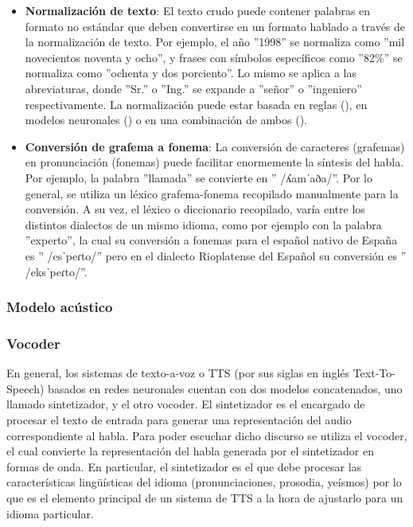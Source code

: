 \begin{itemize}
    \item \textbf{Normalización de texto}: El texto crudo puede contener palabras en formato no estándar que deben convertirse en un formato hablado a través de la normalización de texto. Por ejemplo, el año ''1998'' se normaliza como ''mil novecientos noventa y ocho'', y frases con símbolos específicos como ''82\%'' se normaliza como ''ochenta y dos porciento''. Lo mismo se aplica a las abreviaturas, donde ''Sr.'' o ''Ing.'' se expande a ''señor'' o ''ingeniero'' respectivamente. La normalización puede estar basada en reglas (\cite{sproat2001}), en modelos neuronales (\cite{sproat2016}) o en una combinación de ambos (\cite{zhang2020}).
    
    \item \textbf{Conversión de grafema a fonema}: La conversión de caracteres (grafemas) en pronunciación (fonemas) puede facilitar enormemente la síntesis del habla. Por ejemplo, la palabra ''llamada'' se convierte en ''{\setmainfont{Doulos SIL} /ʎamˈaða/}''. Por lo general, se utiliza un léxico grafema-fonema recopilado manualmente para la conversión. A su vez, el léxico o diccionario recopilado, varía entre los distintos dialectos de un mismo idioma, como por ejemplo con la palabra ''experto'', la cual su conversión a fonemas para el español nativo de España es ''{\setmainfont{Doulos SIL} /esˈpeɾto/}'' pero en el dialecto Rioplatense del Español su conversión es
    ''{\setmainfont{Doulos SIL} /eksˈpeɾto/}''.
\end{itemize}

\subsubsection{Modelo acústico}

\subsubsection{Vocoder}

En general, los sistemas de texto-a-voz o TTS (por sus siglas en inglés Text-To-Speech) basados en redes neuronales cuentan con dos modelos concatenados, uno llamado sintetizador, y el otro vocoder. El sintetizador es el encargado de procesar el texto de entrada para generar una representación del audio correspondiente al habla. Para poder escuchar dicho discurso se utiliza el vocoder, el cual convierte la representación del habla generada por el sintetizador en formas de onda. En particular, el sintetizador es el que debe procesar las características lingüísticas del idioma (pronunciaciones, prosodia, yeísmos) por lo que es el elemento principal de un sistema de TTS a la hora de ajustarlo para un idioma particular. 



